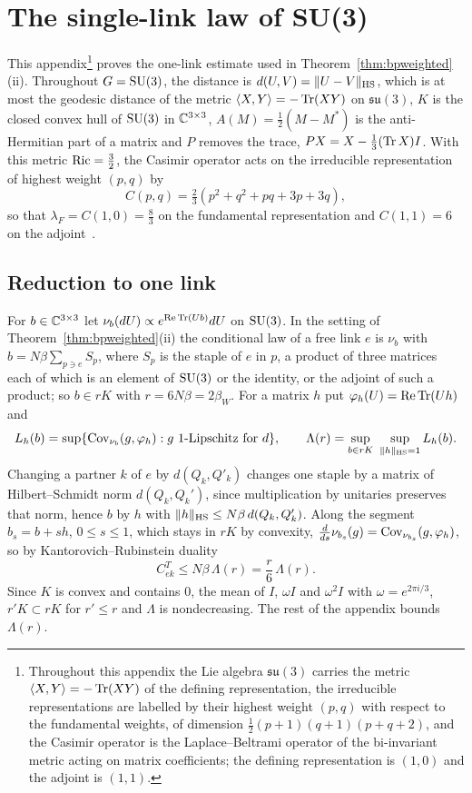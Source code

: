 \section{The single-link law of SU(3)}\label{app:su3}

This appendix\footnote{Throughout
this appendix the Lie algebra $\mathfrak{su}(3)$ carries the metric
$\langle X,Y\rangle=-\operatorname{Tr}(XY)$ of the defining representation, the irreducible
representations are labelled by their highest weight $(p,q)$ with respect
to the fundamental weights, of dimension $\frac12(p+1)(q+1)(p+q+2)$, and the
Casimir operator is the Laplace--Beltrami operator of the bi-invariant
metric acting on matrix coefficients; the defining representation is
$(1,0)$ and the adjoint is $(1,1)$.} proves the one-link estimate used in
Theorem~\ref{thm:bpweighted}(ii). Throughout $G=\mathrm{SU}(3)$, the distance is
$d(U,V)=\|U-V\|_{\rm HS}$, which is at most the geodesic distance of the
metric $\langle X,Y\rangle=-\operatorname{Tr}(XY)$ on $\mathfrak{su}(3)$, $K$ is the closed convex hull
of $\mathrm{SU}(3)$ in $\mathbb{C}^{3\times3}$, $A(M)=\frac12(M-M^*)$ is the anti-Hermitian
part of a matrix and $P$ removes the trace, $PX=X-\frac13(\operatorname{Tr} X)I$. With this
metric $\operatorname{Ric}=\frac32$, the Casimir operator acts on the irreducible
representation of highest weight $(p,q)$ by
\begin{equation}\label{eq:casimir}
C(p,q)=\tfrac23(p^2+q^2+pq+3p+3q),
\end{equation}
so that $\lambda_F=C(1,0)=\frac83$ on the fundamental representation and
$C(1,1)=6$ on the adjoint~\cite[Sec.~15.3]{FH91}.

\subsection{Reduction to one link}

For $b\in\mathbb{C}^{3\times3}$ let $\nu_b(dU)\propto e^{\operatorname{Re}\operatorname{Tr}(Ub)}dU$ on $\mathrm{SU}(3)$. In
the setting of Theorem~\ref{thm:bpweighted}(ii) the conditional law of a free
link $e$ is $\nu_b$ with $b=N\beta\sum_{p\ni e}S_p$, where $S_p$ is the staple
of $e$ in $p$, a product of three matrices each of which is an element of
$\mathrm{SU}(3)$ or the identity, or the adjoint of such a product; so $b\in rK$ with
$r=6N\beta=2\beta_W$. For a matrix $h$ put $\varphi_h(U)=\operatorname{Re}\operatorname{Tr}(Uh)$ and
\[
L_h(b)=\sup\{\operatorname{Cov}_{\nu_b}(g,\varphi_h):g\text{ $1$-Lipschitz for }d\},\qquad
\Lambda(r)=\sup_{b\in rK}\ \sup_{\|h\|_{\rm HS}=1}L_h(b).
\]
Changing a partner $k$ of $e$ by $d(Q_k,Q'_k)$ changes one staple by a matrix
of Hilbert--Schmidt norm $d(Q_k,Q_k')$, since multiplication by unitaries
preserves that norm, hence $b$ by $h$ with $\|h\|_{\rm HS}\le N\beta\,d(Q_k,
Q'_k)$. Along the segment $b_s=b+sh$, $0\le s\le1$, which stays in $rK$ by
convexity, $\frac d{ds}\nu_{b_s}(g)=\operatorname{Cov}_{\nu_{b_s}}(g,\varphi_h)$, so
by Kantorovich--Rubinstein duality
\begin{equation}\label{eq:su3onelink}
C^T_{ek}\le N\beta\,\Lambda(r)=\frac r6\,\Lambda(r).
\end{equation}
Since $K$ is convex and contains $0$, the mean of $I$, $\omega I$ and
$\omega^2I$ with $\omega=e^{2\pi i/3}$, $r'K\subset rK$ for $r'\le r$ and
$\Lambda$ is nondecreasing. The rest of the appendix bounds $\Lambda(r)$.

